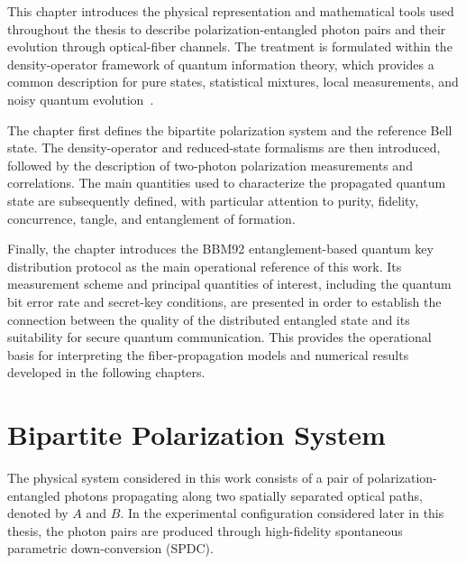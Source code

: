 
This chapter introduces the physical representation and mathematical tools used
throughout the thesis to describe polarization-entangled photon pairs and their
evolution through optical-fiber channels. The treatment is formulated within the
density-operator framework of quantum information theory, which provides a common
description for pure states, statistical mixtures, local measurements, and noisy
quantum evolution~\cite{nielsen_chuang_qcqi}.

The chapter first defines the bipartite polarization system and the reference Bell
state. The density-operator and reduced-state formalisms are then introduced,
followed by the description of two-photon polarization measurements and
correlations. The main quantities used to characterize the propagated quantum
state are subsequently defined, with particular attention to purity, fidelity,
concurrence, tangle, and entanglement of formation.

Finally, the chapter introduces the BBM92 entanglement-based quantum key
distribution protocol as the main operational reference of this work. Its
measurement scheme and principal quantities of interest, including the quantum
bit error rate and secret-key conditions, are presented in order to establish the
connection between the quality of the distributed entangled state and its
suitability for secure quantum communication. This provides the operational basis
for interpreting the fiber-propagation models and numerical results developed in
the following chapters.


\section{Bipartite Polarization System}
\label{sec:bipartite_polarization_system}

The physical system considered in this work consists of a pair of
polarization-entangled photons propagating along two spatially separated optical
paths, denoted by \(A\) and \(B\). In the experimental configuration considered
later in this thesis, the photon pairs are produced through high-fidelity 
spontaneous parametric down-conversion (SPDC).

